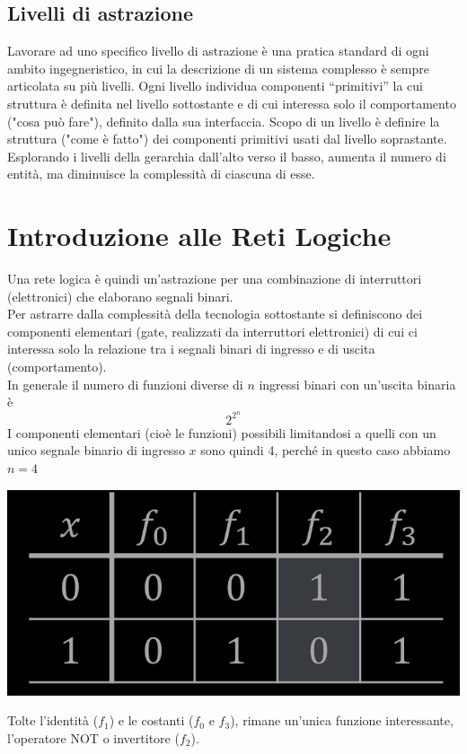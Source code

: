 \documentclass{article}
\begin{document}
\subsection{Livelli di astrazione}
Lavorare ad uno specifico livello di astrazione è una pratica standard di ogni ambito ingegneristico, in cui la descrizione di un sistema complesso è sempre articolata su più livelli. Ogni livello individua componenti “primitivi” la cui struttura è definita nel livello sottostante e di cui interessa solo il comportamento ("cosa può fare"), definito dalla sua interfaccia. Scopo di un livello è definire la struttura ("come è fatto") dei componenti primitivi usati dal livello soprastante. Esplorando i livelli della gerarchia dall’alto verso il basso, aumenta il numero di entità, ma diminuisce la complessità di ciascuna di esse.
\section{Introduzione alle Reti Logiche}
Una rete logica è quindi un'astrazione per una combinazione di interruttori (elettronici) che elaborano segnali binari.\\
Per astrarre dalla complessità della tecnologia sottostante si definiscono dei componenti elementari (gate, realizzati da interruttori elettronici) di cui ci interessa solo la relazione tra i segnali binari di ingresso e di uscita (comportamento).
\vspace{0.2cm}\\
In generale il numero di funzioni diverse di $n$ ingressi binari con un’uscita binaria è
$$ 2^{2^n} $$
I componenti elementari (cioè le funzioni) possibili limitandosi a quelli con un unico segnale binario di ingresso $x$ sono quindi 4, perché in questo caso abbiamo $n=4$
\begin{center}
    \includegraphics[scale=0.4]{funzioni1.png}
\end{center}
Tolte l’identità ($f_1$) e le costanti ($f_0$ e $f_3$), rimane un’unica funzione interessante, l’operatore NOT o invertitore ($f_2$).
\end{document}
